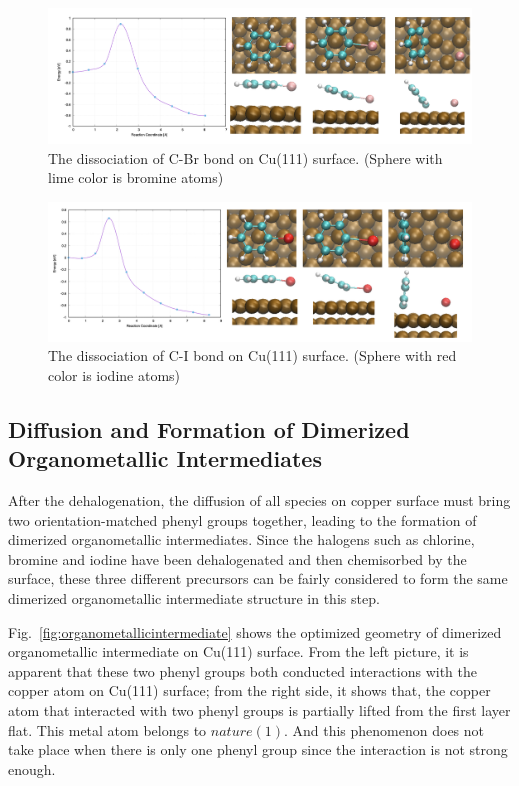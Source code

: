 \documentclass[%
 reprint,
 amsmath,amssymb,
 aps,
prb,
]{revtex4-2}
\begin{document}
\begin{figure}[hbt]
\centering
\includegraphics[width=1.0\textwidth]{Fig/dissociation_Br.png}
\caption{The dissociation of C-Br bond on Cu(111) surface. (Sphere with lime color is bromine atoms)}
\label{fig:dissociation_Br}
\end{figure}

\begin{figure}[hbt]
\centering
\includegraphics[width=1.0\textwidth]{Fig/dissociation_I.png}
\caption{The dissociation of C-I bond on Cu(111) surface. (Sphere with red color is iodine atoms)}
\label{fig:dissociation_I}
\end{figure}

\subsection{Diffusion and Formation of Dimerized Organometallic Intermediates}

After the dehalogenation, the diffusion of all species on copper surface must bring two orientation-matched phenyl groups together, leading to the formation of dimerized organometallic intermediates. Since the halogens such as chlorine, bromine and iodine have been dehalogenated and then chemisorbed by the surface, these three different precursors can be fairly considered to form the same dimerized organometallic intermediate structure in this step.

Fig.~\ref{fig:organometallicintermediate} shows the optimized geometry of dimerized organometallic intermediate on Cu(111) surface. From the left picture, it is apparent that these two phenyl groups both conducted interactions with the copper atom on Cu(111) surface; from the right side, it shows that, the copper atom that interacted with two phenyl groups is partially lifted from the first layer flat. This metal atom belongs to $nature(1)$. And this phenomenon does not take place when there is only one phenyl group since the interaction is not strong enough. 
\end{document}
